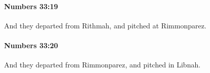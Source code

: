 		\paragraph{Numbers 33:19} %
			\label{NUMBERS-33-19}

			And they departed from Rithmah, and pitched at Rimmonparez.


		\paragraph{Numbers 33:20} %
			\label{NUMBERS-33-20}

			And they departed from Rimmonparez, and pitched in Libnah.


